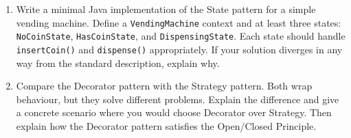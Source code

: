 \documentclass[twoside=false,DIV=14]{scrartcl}
\begin{document}
\begin{enumerate}
\item Write a minimal Java implementation of the State pattern for a simple vending machine.  Define a \texttt{VendingMachine} context and at least three states: \texttt{NoCoinState}, \texttt{HasCoinState}, and \texttt{DispensingState}.  Each state should handle \texttt{insertCoin()} and \texttt{dispense()} appropriately. If your solution diverges in any way from the standard description, explain why.

\item Compare the Decorator pattern with the Strategy pattern.  Both wrap behaviour, but they solve different problems.  Explain the difference and give a concrete scenario where you would choose Decorator over Strategy.  Then explain how the Decorator pattern satisfies the Open/Closed Principle.
\end{enumerate}
\end{document}
